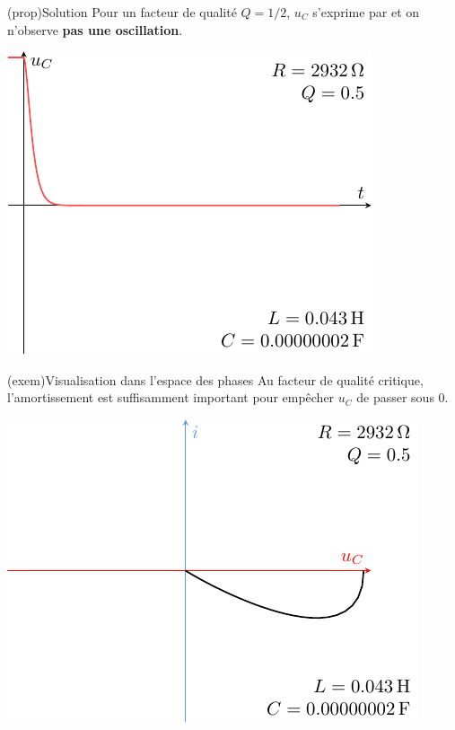 \documentclass[../../main/main.tex]{subfiles}
\begin{document}
\begin{tcb}[label=prop:solupseudoper, sidebyside](prop){Solution}
	Pour un facteur de qualité $Q = 1/2$, $u_C$ s'exprime par
	et on n'observe \textbf{pas une oscillation}.
	\tcblower
	\begin{center}
		\includegraphics[width=\linewidth]{carac-rlc-05}
	\end{center}
\end{tcb}
\begin{tcb}[sidebyside](exem){Visualisation dans l'espace des phases}
	Au facteur de qualité critique, l'amortissement est suffisamment important
	pour empêcher $u_C$ de passer sous 0.
	\tcblower
	\begin{center}
		\includegraphics[width=.9\linewidth]{carac-rlc_xy-05}
	\end{center}
\end{tcb}
\end{document}
